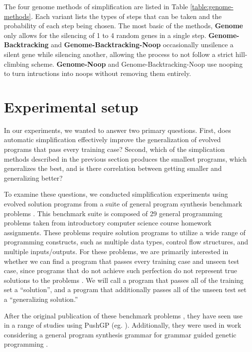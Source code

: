 The four genome methods of simplification are listed in Table \ref{table:genome-methods}. Each variant lists the types of steps that can be taken and the probability of each step being chosen. The most basic of the methods, \textbf{Genome} only allows for the silencing of 1 to 4 random genes in a single step. \textbf{Genome-Backtracking} and \textbf{Genome-Backtracking-Noop} occasionally unsilence a silent gene while silencing another, allowing the process to not follow a strict hill-climbing scheme.  \textbf{Genome-Noop} and Genome-Backtracking-Noop use nooping to turn intructions into noops without removing them entirely.



\section{Experimental setup}
\label{sec:setup}

In our experiments, we wanted to answer two primary questions. First, does automatic simplification effectively improve the generalization of evolved programs that pass every training case? Second, which of the simplication methods described in the previous section produces the smallest programs, which generalizes the best, and is there correlation between getting smaller and generalizing better?

To examine these questions, we conducted simplification experiments using evolved solution programs from a suite of general program synthesis benchmark problems \cite{Helmuth:2015:GECCO}. This benchmark suite is composed of 29 general programming problems taken from introductory computer science course homework assignments. These problems require solution programs to utilize a wide range of programming constructs, such as multiple data types, control flow structures, and multiple inputs/outputs. For these problems, we are primarily interested in whether we can find a program that passes every training case and unseen test case, since programs that do not achieve such perfection do not represent true solutions to the problems \cite{Helmuth:2015:GECCO}. We will call a program that passes all of the training set a ``solution'', and a program that additionally passes all of the unseen test set a ``generalizing solution.''

After the original publication of these benchmark problems \cite{Helmuth:2015:GECCO}, they have seen use in a range of studies using PushGP (eg. \cite{Helmuth:2016:GECCO, McPhee:2016:GPTP, Helmuth:2015:GPTP, Helmuth:2015:dissertation}). Additionally, they were used in work considering a general program synthesis grammar for grammar guided genetic programming \cite{Forstenlechner:2017:eurogp}.

